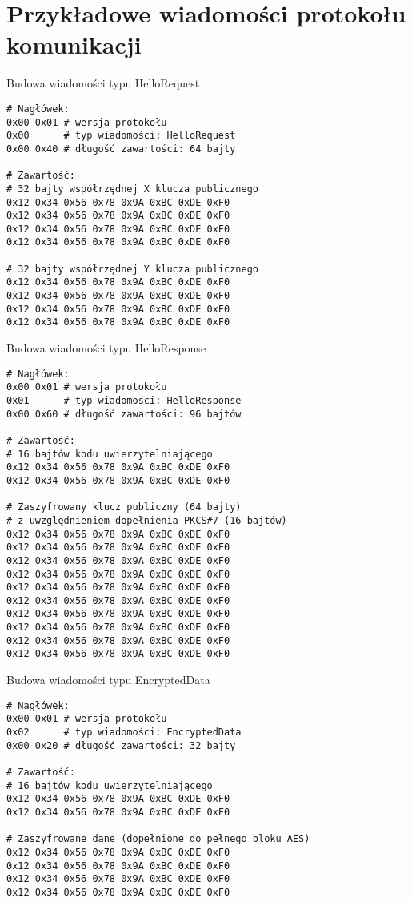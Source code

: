 \chapter{Przykładowe wiadomości protokołu komunikacji}
\label{app:samplerecords}

\begin{table}[h]
\centering
\caption{Budowa wiadomości typu HelloRequest}
\begin{BVerbatim}
# Nagłówek:
0x00 0x01 # wersja protokołu
0x00      # typ wiadomości: HelloRequest
0x00 0x40 # długość zawartości: 64 bajty

# Zawartość:
# 32 bajty współrzędnej X klucza publicznego
0x12 0x34 0x56 0x78 0x9A 0xBC 0xDE 0xF0
0x12 0x34 0x56 0x78 0x9A 0xBC 0xDE 0xF0
0x12 0x34 0x56 0x78 0x9A 0xBC 0xDE 0xF0
0x12 0x34 0x56 0x78 0x9A 0xBC 0xDE 0xF0

# 32 bajty współrzędnej Y klucza publicznego
0x12 0x34 0x56 0x78 0x9A 0xBC 0xDE 0xF0
0x12 0x34 0x56 0x78 0x9A 0xBC 0xDE 0xF0
0x12 0x34 0x56 0x78 0x9A 0xBC 0xDE 0xF0
0x12 0x34 0x56 0x78 0x9A 0xBC 0xDE 0xF0
\end{BVerbatim}
\label{fig:hellorequestsample}
\end{table}

\begin{table}
\centering
\caption{Budowa wiadomości typu HelloResponse}
\begin{BVerbatim}
# Nagłówek:
0x00 0x01 # wersja protokołu
0x01      # typ wiadomości: HelloResponse
0x00 0x60 # długość zawartości: 96 bajtów

# Zawartość:
# 16 bajtów kodu uwierzytelniającego
0x12 0x34 0x56 0x78 0x9A 0xBC 0xDE 0xF0
0x12 0x34 0x56 0x78 0x9A 0xBC 0xDE 0xF0

# Zaszyfrowany klucz publiczny (64 bajty)
# z uwzględnieniem dopełnienia PKCS#7 (16 bajtów)
0x12 0x34 0x56 0x78 0x9A 0xBC 0xDE 0xF0
0x12 0x34 0x56 0x78 0x9A 0xBC 0xDE 0xF0
0x12 0x34 0x56 0x78 0x9A 0xBC 0xDE 0xF0
0x12 0x34 0x56 0x78 0x9A 0xBC 0xDE 0xF0
0x12 0x34 0x56 0x78 0x9A 0xBC 0xDE 0xF0
0x12 0x34 0x56 0x78 0x9A 0xBC 0xDE 0xF0
0x12 0x34 0x56 0x78 0x9A 0xBC 0xDE 0xF0
0x12 0x34 0x56 0x78 0x9A 0xBC 0xDE 0xF0
0x12 0x34 0x56 0x78 0x9A 0xBC 0xDE 0xF0
0x12 0x34 0x56 0x78 0x9A 0xBC 0xDE 0xF0
\end{BVerbatim}
\label{fig:helloresponsesample}
\end{table}

\begin{table}
\centering
\caption{Budowa wiadomości typu EncryptedData}
\begin{BVerbatim}
# Nagłówek:
0x00 0x01 # wersja protokołu
0x02      # typ wiadomości: EncryptedData
0x00 0x20 # długość zawartości: 32 bajty

# Zawartość:
# 16 bajtów kodu uwierzytelniającego
0x12 0x34 0x56 0x78 0x9A 0xBC 0xDE 0xF0
0x12 0x34 0x56 0x78 0x9A 0xBC 0xDE 0xF0

# Zaszyfrowane dane (dopełnione do pełnego bloku AES)
0x12 0x34 0x56 0x78 0x9A 0xBC 0xDE 0xF0
0x12 0x34 0x56 0x78 0x9A 0xBC 0xDE 0xF0
0x12 0x34 0x56 0x78 0x9A 0xBC 0xDE 0xF0
0x12 0x34 0x56 0x78 0x9A 0xBC 0xDE 0xF0
\end{BVerbatim}
\label{fig:encrypteddatasample}
\end{table}
